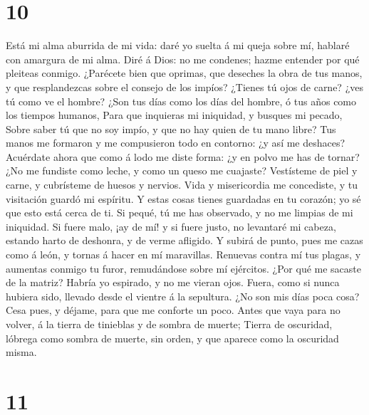 \hypertarget{section-9}{%
\section{10}\label{section-9}}

 Está mi alma aburrida de mi vida: daré yo suelta á mi queja
sobre mí, hablaré con amargura de mi alma.  Diré á Dios: no
me condenes; hazme entender por qué pleiteas conmigo. 
¿Parécete bien que oprimas, que deseches la obra de tus manos, y que
resplandezcas sobre el consejo de los impíos?  ¿Tienes tú
ojos de carne? ¿ves tú como ve el hombre?  ¿Son tus días
como los días del hombre, ó tus años como los tiempos humanos,
 Para que inquieras mi iniquidad, y busques mi pecado,
 Sobre saber tú que no soy impío, y que no hay quien de tu
mano libre?  Tus manos me formaron y me compusieron todo en
contorno: ¿y así me deshaces?  Acuérdate ahora que como á
lodo me diste forma: ¿y en polvo me has de tornar?  ¿No me
fundiste como leche, y como un queso me cuajaste? 
Vestísteme de piel y carne, y cubrísteme de huesos y nervios.
 Vida y misericordia me concediste, y tu visitación guardó
mi espíritu.  Y estas cosas tienes guardadas en tu corazón;
yo sé que esto está cerca de ti.  Si pequé, tú me has
observado, y no me limpias de mi iniquidad.  Si fuere malo,
¡ay de mí! y si fuere justo, no levantaré mi cabeza, estando harto de
deshonra, y de verme afligido.  Y subirá de punto, pues me
cazas como á león, y tornas á hacer en mí maravillas. 
Renuevas contra mí tus plagas, y aumentas conmigo tu furor, remudándose
sobre mí ejércitos.  ¿Por qué me sacaste de la matriz?
Habría yo espirado, y no me vieran ojos.  Fuera, como si
nunca hubiera sido, llevado desde el vientre á la sepultura.
 ¿No son mis días poca cosa? Cesa pues, y déjame, para que
me conforte un poco.  Antes que vaya para no volver, á la
tierra de tinieblas y de sombra de muerte;  Tierra de
oscuridad, lóbrega como sombra de muerte, sin orden, y que aparece como
la oscuridad misma.

\hypertarget{section-10}{%
\section{11}\label{section-10}}

